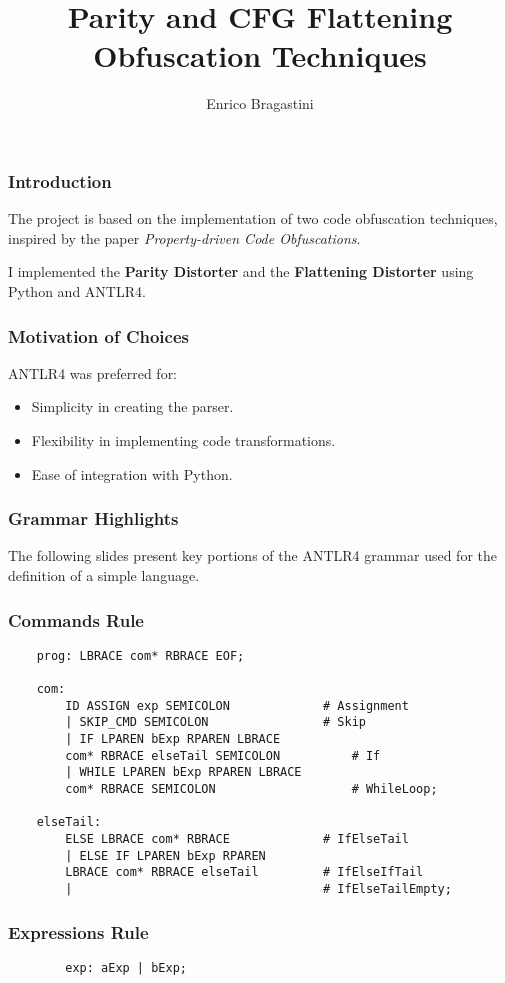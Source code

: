 \documentclass{beamer}
\title{Parity and CFG Flattening\\Obfuscation Techniques}
\author{Enrico Bragastini}
\date{}
\begin{document}
\begin{frame}
    \titlepage
\end{frame}

\begin{frame}
    \frametitle{Introduction}
    The project is based on the implementation of two code obfuscation techniques, inspired by the paper \textit{Property-driven Code Obfuscations}.

    I implemented the \textbf{Parity Distorter} and the \textbf{Flattening Distorter} using Python and ANTLR4.
\end{frame}

\begin{frame}
    \frametitle{Motivation of Choices}
    ANTLR4 was preferred for:
    \begin{itemize}
        \item Simplicity in creating the parser.
        \item Flexibility in implementing code transformations.
        \item Ease of integration with Python.
    \end{itemize}
\end{frame}

\begin{frame}
    \frametitle{Grammar Highlights}
    The following slides present key portions of the ANTLR4 grammar used for the definition of a simple language.
\end{frame}

\begin{frame}[fragile]
    \frametitle{Commands Rule}
    \scriptsize
    \begin{verbatim}
    prog: LBRACE com* RBRACE EOF;

    com:
        ID ASSIGN exp SEMICOLON	            # Assignment
        | SKIP_CMD SEMICOLON                # Skip
        | IF LPAREN bExp RPAREN LBRACE 
        com* RBRACE elseTail SEMICOLON          # If
        | WHILE LPAREN bExp RPAREN LBRACE 
        com* RBRACE SEMICOLON                   # WhileLoop;
    
    elseTail:
        ELSE LBRACE com* RBRACE             # IfElseTail
        | ELSE IF LPAREN bExp RPAREN 
        LBRACE com* RBRACE elseTail         # IfElseIfTail
        |                                   # IfElseTailEmpty;
\end{verbatim}
\end{frame}

\begin{frame}[fragile]
    \frametitle{Expressions Rule}
    \scriptsize
    \begin{verbatim}
        exp: aExp | bExp;
    \end{verbatim}
\end{frame}
\end{document}
